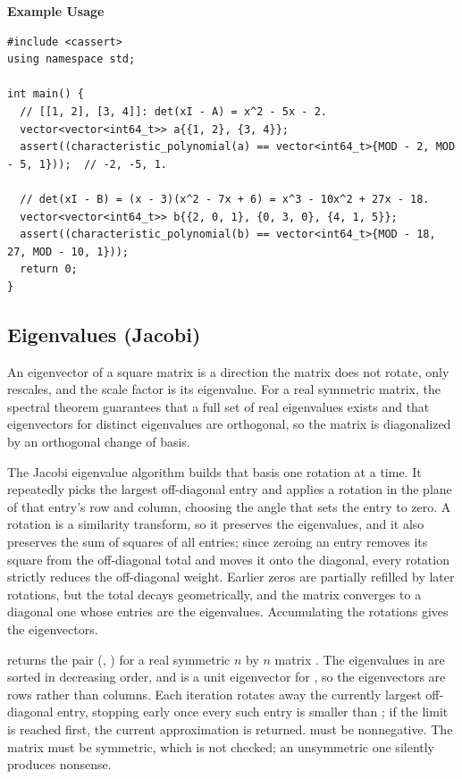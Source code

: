 \textbf{Example Usage}\par
\begin{lstlisting}[style=cpp]
#include <cassert>
using namespace std;

int main() {
  // [[1, 2], [3, 4]]: det(xI - A) = x^2 - 5x - 2.
  vector<vector<int64_t>> a{{1, 2}, {3, 4}};
  assert((characteristic_polynomial(a) == vector<int64_t>{MOD - 2, MOD - 5, 1}));  // -2, -5, 1.

  // det(xI - B) = (x - 3)(x^2 - 7x + 6) = x^3 - 10x^2 + 27x - 18.
  vector<vector<int64_t>> b{{2, 0, 1}, {0, 3, 0}, {4, 1, 5}};
  assert((characteristic_polynomial(b) == vector<int64_t>{MOD - 18, 27, MOD - 10, 1}));
  return 0;
}
\end{lstlisting}
\subsection{Eigenvalues (Jacobi)}
\label{sec:6.5.7}
An eigenvector of a square matrix is a direction the matrix does not rotate, only rescales, and the scale factor is its eigenvalue. For a real symmetric matrix, the spectral theorem guarantees that a full set of real eigenvalues exists and that eigenvectors for distinct eigenvalues are orthogonal, so the matrix is diagonalized by an orthogonal change of basis.

The Jacobi eigenvalue algorithm builds that basis one rotation at a time. It repeatedly picks the largest off-diagonal entry and applies a rotation in the plane of that entry's row and column, choosing the angle that sets the entry to zero. A rotation is a similarity transform, so it preserves the eigenvalues, and it also preserves the sum of squares of all entries; since zeroing an entry removes its square from the off-diagonal total and moves it onto the diagonal, every rotation strictly reduces the off-diagonal weight. Earlier zeros are partially refilled by later rotations, but the total decays geometrically, and the matrix converges to a diagonal one whose entries are the eigenvalues. Accumulating the rotations gives the eigenvectors.

\begin{compactitem}
  \item {} returns the pair (, ) for a real symmetric $n$ by $n$ matrix . The eigenvalues in  are sorted in decreasing order, and  is a unit eigenvector for , so the eigenvectors are rows rather than columns. Each iteration rotates away the currently largest off-diagonal entry, stopping early once every such entry is smaller than ; if the  limit is reached first, the current approximation is returned.  must be nonnegative. The matrix must be symmetric, which is not checked; an unsymmetric one silently produces nonsense.
\end{compactitem}

